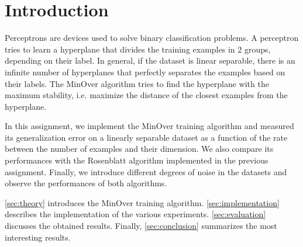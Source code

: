 \section{Introduction}
\label{sec:introduction}

Perceptrons are devices used to solve binary classification problems.
A perceptron tries to learn a hyperplane that divides the training examples in $2$ groups, depending on their label.
In general, if the dataset is linear separable, there is an infinite number of hyperplanes that perfectly separates the examples based on their labels.
The MinOver algorithm \cite{minover} tries to find the hyperplane with the maximum stability, i.e. maximize the distance of the closest examples from the hyperplane.

In this assignment, we implement the MinOver training algorithm and measured its generalization error on a linearly separable dataset as a function of the rate between the number of examples and their dimension.
We also compare its performances with the Rosenblatt algorithm \cite{rosenblatt} implemented in the previous assignment.
Finally, we introduce different degrees of noise in the datasets and observe the performances of both algorithms.

\cref{sec:theory} introduces the MinOver training algorithm.
\cref{sec:implementation} describes the implementation of the various experiments.
\cref{sec:evaluation} discusses the obtained results.
Finally, \cref{sec:conclusion} summarizes the most interesting results.
